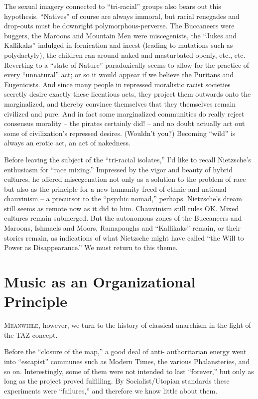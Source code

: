 \documentclass[a4paper,english,10pt,twoside]{article}
\begin{document}
\medskip
The sexual imagery connected to \enquote{tri-racial} groups also bears out this hypothesis. \enquote{Natives} of course are always immoral, but racial renegades and drop-outs must be downright polymorphous-perverse. The Buccaneers were buggers, the Maroons and Mountain Men were miscegenists, the \enquote{Jukes and Kallikaks} indulged in fornication and incest (leading to mutations such as polydactyly), the children ran around naked and masturbated openly, etc., etc. Reverting to a \enquote{state of Nature} paradoxically seems to allow for the practice of every \enquote{unnatural} act; or so it would appear if we believe the Puritans and Eugenicists. And since many people in repressed moralistic racist societies secretly desire exactly these licentious acts, they project them outwards onto the marginalized, and thereby convince themselves that they themselves remain civilized and pure. And in fact some marginalized communities do really reject consensus morality -- the pirates certainly did! -- and no doubt actually act out some of civilization's repressed desires. (Wouldn't you?) Becoming \enquote{wild} is always an erotic act, an act of nakedness.

\medskip
Before leaving the subject of the \enquote{tri-racial isolates,} I'd like to recall Nietzsche's enthusiasm for \enquote{race mixing.} Impressed by the vigor and beauty of hybrid cultures, he offered miscegenation not only as a solution to the problem of race but also as the principle for a new humanity freed of ethnic and national chauvinism -- a precursor to the \enquote{psychic nomad,} perhaps. Nietzsche's dream still seems as remote now as it did to him. Chauvinism still rules OK. Mixed cultures remain submerged. But the autonomous zones of the Buccaneers and Maroons, Ishmaels and Moors, Ramapaughs and \enquote{Kallikaks} remain, or their stories remain, as indications of what Nietzsche might have called \enquote{the Will to Power as Disappearance.} We must return to this theme.

\section{Music as an Organizational Principle}

\lettrine{M}{eanwhile}, however, we turn to the history of classical anarchism in the light of the TAZ concept.

Before the \enquote{closure of the map,} a good deal of anti- authoritarian energy went into \enquote{escapist} communes such as Modern Times, the various Phalansteries, and so on. Interestingly, some of them were not intended to last \enquote{forever,} but only as long as the project proved fulfilling. By Socialist/Utopian standards these experiments were \enquote{failures,} and therefore we know little about them.
\end{document}
